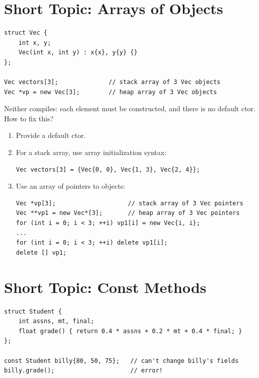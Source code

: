 \section{Short Topic: Arrays of Objects}
\begin{lstlisting}[style=cpp]
struct Vec {
    int x, y;
    Vec(int x, int y) : x{x}, y{y} {}
};

Vec vectors[3];              // stack array of 3 Vec objects
Vec *vp = new Vec[3];        // heap array of 3 Vec objects
\end{lstlisting}
Neither compiles: each element must be constructed, and there is no default
ctor. How to fix this?
\begin{enumerate}
  \item Provide a default ctor.
  \item For a stack array, use array initialization syntax:
\begin{lstlisting}[style=cpp]
Vec vectors[3] = {Vec{0, 0}, Vec{1, 3}, Vec{2, 4}};
\end{lstlisting}
  \item Use an array of pointers to objects:
\begin{lstlisting}[style=cpp]
Vec *vp[3];                    // stack array of 3 Vec pointers
Vec **vp1 = new Vec*[3];       // heap array of 3 Vec pointers
for (int i = 0; i < 3; ++i) vp1[i] = new Vec{i, i};
...
for (int i = 0; i < 3; ++i) delete vp1[i];
delete [] vp1;
\end{lstlisting}
\end{enumerate}
\begin{center}
\end{center}

\section{Short Topic: Const Methods}
\begin{lstlisting}[style=cpp]
struct Student {
    int assns, mt, final;
    float grade() { return 0.4 * assns + 0.2 * mt + 0.4 * final; }
};

const Student billy{80, 50, 75};   // can't change billy's fields
billy.grade();                     // error!
\end{lstlisting}
